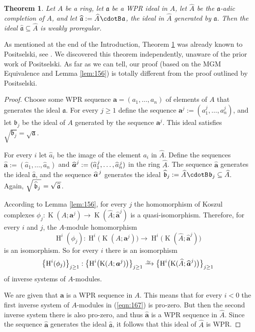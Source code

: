 \documentclass[10pt]{amsart}
\newtheorem{thm}[equation]{Theorem}
\theoremstyle{definition}
\numberwithin{equation}{section}
\newcommand{\iso}{\xrightarrow{%
\smash{\raisebox{-0.5ex}{\ensuremath{\scriptstyle \simeq  \mspace{2mu}}}}}}
\newcommand{\sub}{\subseteq}
\newcommand{\opn}{\operatorname}
\newcommand{\cd}{\mspace{1.3mu}{\cdotB}\mspace{1.3mu}}
\newcommand{\mfrak}[1]{\mathfrak{#1}}
\renewcommand{\a}{\mfrak{a}}
\renewcommand{\b}{\mfrak{b}}
\newcommand{\ba}{\bsym{a}}
\newcommand{\bsym}[1]{\boldsymbol{#1}}
\newcommand{\what}[1]{\widehat{#1}}
\newcommand{\msp}[1]{\mspace{#1 mu}}
\begin{document}
\begin{thm} \label{thm:240}
Let $A$ be a ring, let $\a$ be a WPR ideal in $A$,
let $\what{A}$ be the $\a$-adic completion of $A$, and let
$\what{\a} := \what{A} \cd \a$, the ideal in $\what{A}$ generated by $\a$. Then
the ideal $\what{\a} \sub \what{A}$ is weakly proregular.
\end{thm}

As mentioned at the end of the Introduction, Theorem \ref{thm:240} was
already known to Positselski, see \cite[Example 5.2(2)]{Po1}.
We discovered this theorem independently, unaware of the prior work of
Positselski. As far as we can tell, our proof
(based on the MGM Equivalence and Lemma \ref{lem:156}) is totally different
from the proof outlined by Positselski.

\begin{proof}
Choose some WPR sequence
$\ba = (a_1, \ldots, a_n)$ of elements of $A$ that generates the ideal $\a$.
For every $j \geq 1$ define the sequence
$\ba^j := (a_1^j, \ldots, a_n^j)$,
and let $\b_j$ be the ideal of $A$ generated by the sequence $\ba^j$.
This ideal satisfies $\sqrt{\b_j} = \sqrt{\a}$.

For every $i$ let $\what{a}_i$ be the image of the element $a_i$ in
$\what{A}$. Define the sequences
$\what{\ba} := (\what{a}_1, \ldots, \what{a}_n)$
and
$\what{\ba}^j := (\what{a}_1^{\msp{2} j}, \ldots, \what{a}_n^{\msp{2} j})$ in
the ring $\what{A}$.
The sequence $\what{\ba}$ generates the ideal $\what{\a}$,
and the sequence $\what{\ba}^{\msp{2} j}$ generates the ideal
$\what{\b}_j := \what{A} \cd \b_j \sub \what{A}$.
Again,
$\sqrt{\msp{3} \what{\b}_j \msp{2}} =
\sqrt{\msp{2} \what{\a} \msp{2}}$.

According to Lemma \ref{lem:156}, for every $j$ the homomorphism of Koszul
complexes
$\phi_j : \opn{K}(A; \ba^j) \to \opn{K}(\what{A}; \what{\ba}^j)$
is a quasi-isomorphism. Therefore, for every $i$ and $j$, the $A$-module
homomorphism
\[ \opn{H}^i(\phi_j) :
\opn{H}^i \bigl( \opn{K}(A; \ba^j) \bigr) \to
\opn{H}^i \bigl( \opn{K}(\what{A}; \what{\ba}^j) \bigr) \]
is an isomorphism. So for every $i$ there is an isomorphism
\begin{equation} \label{eqn:167}
\bigl\{ \opn{H}^i(\phi_j) \bigr\}_{j \geq 1} :
\bigl\{ \opn{H}^i \bigl( \opn{K}(A; \ba^j) \bigr) \bigr\}_{j \geq 1}
\iso
\bigl\{ \opn{H}^i \bigl( \opn{K}(\what{A}; \what{\ba}^j) \bigr)
\bigr\}_{j \geq 1}
\end{equation}
of inverse systems of $A$-modules.

We are given that $\ba$ is a WPR sequence in $A$.
This means that for every $i < 0$ the first inverse system of $A$-modules
in (\ref{eqn:167}) is pro-zero. But then the second inverse system there is
also pro-zero, and thus $\what{\ba}$ is a WPR sequence in $\what{A}$.
Since the sequence $\what{\ba}$ generates the ideal $\what{\a}$, it follows
that this ideal of $\what{A}$ is WPR.
\end{proof}
\end{document}
